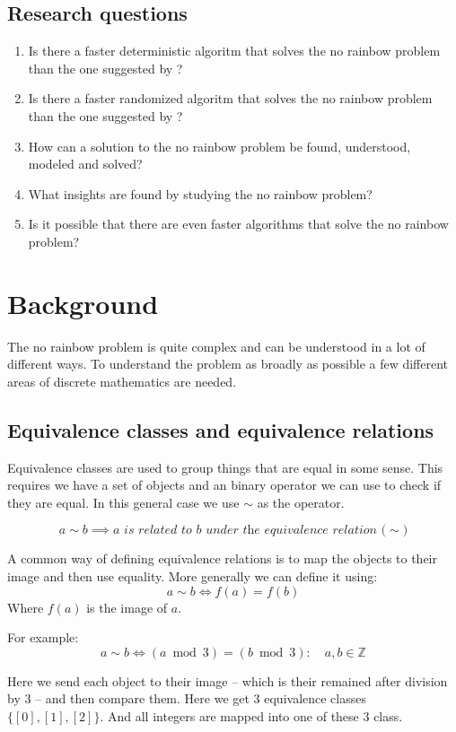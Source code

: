 \documentclass{article}
\begin{document}
\subsection{Research questions}
\begin{enumerate}
  \item Is there a faster deterministic algoritm that solves the no rainbow problem than the one suggested by \cite{sourceNoRainbow}?
  \item Is there a faster randomized algoritm that solves the no rainbow problem than the one suggested by \cite{sourceNoRainbow}?
  \item How can a solution to the no rainbow problem be found, understood, modeled and solved?
  \item What insights are found by studying the no rainbow problem?
  \item Is it possible that there are even faster algorithms that solve the no rainbow problem?
\end{enumerate}

\section{Background}
The no rainbow problem is quite complex and can be understood in a lot of different ways.
To understand the problem as broadly as possible a few different areas of discrete mathematics are needed.

\subsection{Equivalence classes and equivalence relations}
Equivalence classes are used to group things that are equal in some sense.
This requires we have a set of objects and an binary operator we can use to check if they are equal.
In this general case we use $\sim$ as the operator.

$$
  a \sim b \implies \textit{$a$ is related to $b$ under the equivalence relation ($\sim$)}
$$

A common way of defining equivalence relations is to map the objects to their image and then use equality.
More generally we can define it using:
$$
  a \sim b \iff f(a) = f(b)
$$
Where $f(a)$ is the image of $a$.

For example:
$$
  a \sim b \iff (a \bmod 3) = (b \bmod 3) : \quad a, b \in \mathds{Z}
$$

Here we send each object to their image -- which is their remained after division by 3 -- and then compare them.
Here we get 3 equivalence classes $\{[0], [1], [2]\}$. And all integers are mapped into one of these 3 class.
\end{document}
